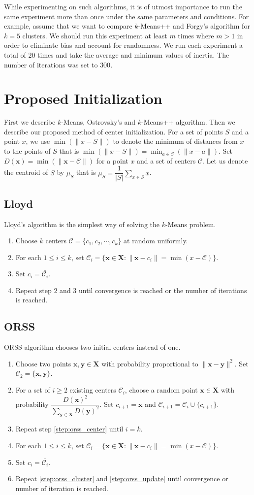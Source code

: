 \documentclass[twoside, 11pt]{article}
\newcommand{\x}{\mathbf{x}}
\newcommand{\X}{\mathbf{X}}
\newcommand{\y}{\mathbf{y}}
\newcommand{\C}{\mathcal{C}}
\begin{document}
	While experimenting on such algorithms, it is of utmost importance to run the same experiment more than once under the same parameters and conditions. For example, assume that we want to compare $k$-Means++ and Forgy's algorithm \citep{forgy} for $k=5$ clusters. We should run this experiment at least $m$ times where $m>1$ in order to eliminate bias and account for randomness. We run each experiment a total of $20$ times and take the average and minimum values of inertia. The number of iterations was set to $300$.
	\section{Proposed Initialization}
	First we describe $k$-Means, Ostrovsky's and $k$-Means++ algorithm. Then we describe our proposed method of center initialization. For a set of points $S$ and a point $x$, we use $\min(\|x-S\|)$ to denote the minimum of distances from $x$ to the points of $S$ that is $\min(\| x-S\|)=\min_{a\in S}(\| x-a\|)$. Set $D(\x)=\min(\|\x-\C\|)$ for a point $x$ and a set of centers $\C$. Let us denote the centroid of $S$ by $\mu_S$ that is $\mu_S=\dfrac{1}{|S|}\sum_{x\in S}x$.
	\subsection{Lloyd}
	Lloyd's algorithm is the simplest way of solving the $k$-Means problem.
		\begin{enumerate}[i]
			\item Choose $k$ centers $\C=\{c_1,c_2,\cdots,c_k\}$ at random uniformly.
			\item For each $1\leq i\leq k$, set $\C_i=\{\x\in\X:\|\x-c_i\|=\min(x-\C)\}$.
			\item Set $c_i=\bar{\C_i}$.
			\item Repeat step $2$ and $3$ until convergence is reached or the number of iterations is reached.
		\end{enumerate}
	\subsection{ORSS}
	ORSS algorithm \citep{ostrovsky} chooses two initial centers instead of one.
		\begin{enumerate}[i]
			\item Choose two points $\x,\y\in\X$ with probability proportional to $\|\x-\y\|^2$. Set $\C_2=\{\x,\y\}$.
			\item For a set of $i\geq2$ existing centers $\C_i$, choose a random point $\x\in\X$ with probability $\dfrac{D(\x)^2}{\sum_{\y\in\X}D(\y)^2}$. Set $c_{i+1}=\x$ and $\C_{i+1}=\C_i\cup\{c_{i+1}\}$.\label{step:orss_center}
			\item Repeat step \eqref{step:orss_center} until $i=k$.
			\item For each $1\leq i\leq k$, set $\C_i=\{\x\in\X:\|\x-c_i\|=\min(x-\C)\}$.\label{step:orss_cluster}
			\item Set $c_i=\bar{\C_i}$.\label{step:orss_update}
			\item Repeat \eqref{step:orss_cluster} and \eqref{step:orss_update} until convergence or number of iteration is reached.
		\end{enumerate}
\end{document}
